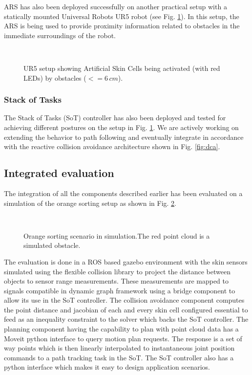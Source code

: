 ARS has also been deployed successfully on another practical setup with a statically mounted Universal Robots UR5 robot (see Fig. \ref{fig:TUDSetup}). In this setup, the ARS is being used to provide proximity information related to obstacles in the immediate surroundings of the robot.
\begin{figure}[h]
\centering
{}\\[-10pt]
\caption[]{UR5 setup showing Artificial Skin Cells being activated (with red LEDs) by obstacles ($<= 6\,cm$).}
\label{fig:TUDSetup}
\end{figure}
\subsubsection{Stack of Tasks}
The Stack of Tasks (SoT) controller has also been deployed and tested for achieving different postures on the setup in Fig. \ref{fig:TUDSetup}. We are actively working on extending the behavior to path following and eventually integrate in accordance with the reactive collision avoidance architecture shown in Fig.  \ref{fig:dca}. 

\subsection{Integrated evaluation}
\hypersetup{colorlinks, linkcolor=blue}
The integration of all the components described earlier has been evaluated on a simulation of the orange sorting setup as shown in Fig. \ref{fig:TOMMSimulation}.

\begin{figure}[h]
\centering
{}\\[-10pt]
\caption[]{Orange sorting scenario in simulation.The red point cloud is a simulated obstacle.}
\label{fig:TOMMSimulation}
\end{figure}
The evaluation is done in a ROS based gazebo environment with the skin sensors simulated using the flexible collision library to project the distance between objects to sensor range measurements. 
These measurements are mapped to signals compatible in dynamic graph framework using a bridge component to allow its use in the SoT controller. The collision avoidance component computes the point 
distance and jacobian of each and every skin cell configured  essential to feed as an inequality constraint to the solver which backs the SoT controller. The planning component having the capability 
to plan with point cloud data has a Moveit python interface to query motion plan requests. The response is a set of way points which is then linearly interpolated to instantaneous joint position commands
to a path tracking task in the SoT. The SoT controller also has a python interface which makes it easy to design application scenarios.

